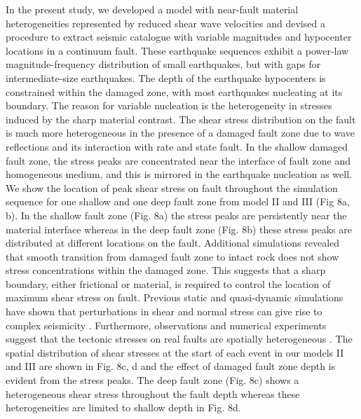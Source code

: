 \documentclass[11pt]{article}
\begin{document}
In the present study, we developed a model with near-fault material heterogeneities represented by reduced shear wave velocities and devised a procedure to extract seismic catalogue with variable magnitudes and hypocenter locations in a continuum fault. These earthquake sequences exhibit a power-law magnitude-frequency distribution of small earthquakes, but with gaps for intermediate-size earthquakes. The depth of the earthquake hypocenters is constrained within the damaged zone, with most earthquakes nucleating at its boundary. The reason for variable nucleation is the heterogeneity in stresses induced by the sharp material contrast. The shear stress distribution on the fault is much more heterogeneous in the presence of a damaged fault zone due to wave reflections and its interaction with rate and state fault. In the shallow damaged fault zone, the stress peaks are concentrated near the interface of fault zone and homogeneous medium, and this is mirrored in the earthquake nucleation as well. We show the location of peak shear stress on fault throughout the simulation sequence for one shallow and one deep fault zone from model II and III (Fig 8a, b). In the shallow fault zone (Fig. 8a) the stress peaks are persistently near the material interface whereas in the deep fault zone (Fig. 8b) these stress peaks are distributed at different locations on the fault. Additional simulations revealed that smooth transition from damaged fault zone to intact rock does not show stress concentrations within the damaged zone. This suggests that a sharp boundary, either frictional or material, is required to control the location of maximum shear stress on fault. Previous static and quasi-dynamic simulations have shown that perturbations in shear and normal stress can give rise to complex seismicity \citep{benzion_2001, perfettini_2003}. Furthermore, observations and numerical experiments suggest that the tectonic stresses on real faults are spatially heterogeneous \citep{townend_zoback_2000, rivera_kanamori_2000}. The spatial distribution of shear stresses at the start of each event in our models II and III are shown in Fig. 8c, d and the effect of damaged fault zone depth is evident from the stress peaks. The deep fault zone (Fig. 8c) shows a heterogeneous shear stress throughout the fault depth whereas these heterogeneities are limited to shallow depth in Fig. 8d.  
\end{document}

